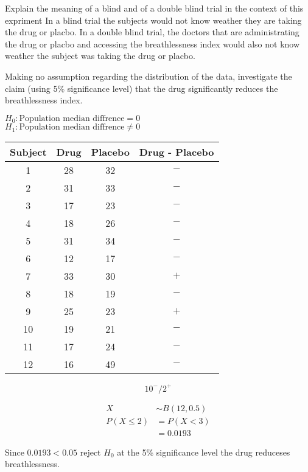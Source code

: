 \begin{example}
        \begin{step}{Explain the meaning of a blind and of a double blind trial in the context of this expriment}
        In a blind trial the subjects would not know weather they are taking the drug or placbo. In a double blind trial, the doctors that are administrating the drug or placbo and accessing the breathlessness index would also not know weather the subject was taking the drug or placbo.
        \end{step}

        \begin{step}{Making no assumption regarding the distribution of the data, investigate the claim (using 5\% significance level) that the drug significantly reduces the breathlessness index.}
        \end{step}
        $H_0: \text{Population median diffrence} = 0$\\
        $H_1: \text{Population median diffrence} \ne 0$

        \begin{center}
        \begin{tabular}{c|c|c|c}
        Subject & Drug & Placebo & Drug - Placebo \\
        \hline
        1  & 28 & 32 & $-$ \\
        2  & 31 & 33 & $-$ \\
        3  & 17 & 23 & $-$ \\
        4  & 18 & 26 & $-$ \\
        5  & 31 & 34 & $-$ \\
        6  & 12 & 17 & $-$ \\
        7  & 33 & 30 & $+$ \\
        8  & 18 & 19 & $-$ \\
        9  & 25 & 23 & $+$ \\
        10 & 19 & 21 & $-$ \\
        11 & 17 & 24 & $-$ \\
        12 & 16 & 49 & $-$ \\
        \end{tabular}
        \end{center}

        $$
        10^- / 2^+
        $$

        \begin{align*}
        X &\sim B(12, 0.5) \\
        P(X \leq 2) &= P(X < 3) \\
        &= 0.0193
        \end{align*}
        
        Since $0.0193 < 0.05$ reject $H_0$ at the 5\% significance level the drug reduceses breathlessness.

        \end{example}
    

